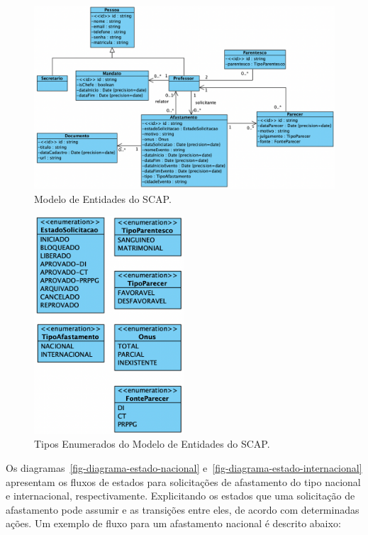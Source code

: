 \begin{figure}[h!]
    \centering
    \includegraphics[width=1\textwidth]{figuras/fig-modelo-entidades.png}
    \caption{Modelo de Entidades do SCAP.}
    \label{fig-modelo-entidades}
\end{figure}

\begin{figure}[h!]
    \centering
    \includegraphics[width=0.5\textwidth]{figuras/fig-modelo-entidades-enum.png}
    \caption{Tipos Enumerados do Modelo de Entidades do SCAP.}
    \label{fig-modelo-entidades-enum}
\end{figure}


Os diagramas~\ref{fig-diagrama-estado-nacional} e~\ref{fig-diagrama-estado-internacional} apresentam os fluxos de estados
para solicitações de afastamento do tipo nacional e internacional, respectivamente.
Explicitando os estados que uma solicitação de afastamento pode assumir e as transições entre eles,
de acordo com determinadas ações. Um exemplo de fluxo para um afastamento nacional é descrito abaixo:

